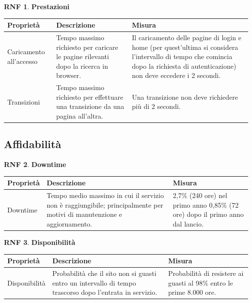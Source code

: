 \documentclass[11pt, a4paper]{article}
\theoremstyle{definition}
\newtheorem{nonfuncreq}{RNF} %
\begin{document}
\begin{nonfuncreq}
    \textbf{Prestazioni }
    \begin{center}
        \footnotesize
        \begin{tabularx}{\textwidth}{|X||X||X|}
            \hline
            \cellcolor{red!70}Proprietà & \cellcolor{red!70}Descrizione & \cellcolor{red!70}Misura\\
            \hline
            Caricamento all'accesso & Tempo massimo richiesto per caricare le pagine rilevanti dopo la ricerca in browser. & Il caricamento delle pagine di login e home (per quest'ultima si considera l'intervallo di tempo che comincia dopo la richiesta di autenticazione) non deve eccedere i 2 secondi.\\
            \hline
            Transizioni & Tempo massimo richiesto per effettuare una transizione da una pagina all'altra.  & Una transizione non deve richiedere più di 2 secondi.\\
            \hline
        \end{tabularx}
    \end{center}
\end{nonfuncreq}


\subsection{Affidabilità}

\begin{nonfuncreq}
    \textbf{Downtime }
    \begin{center}
        \footnotesize
        \begin{tabularx}{\textwidth}{|X||X||X|}
            \hline
            \cellcolor{red!70}Proprietà & \cellcolor{red!70}Descrizione & \cellcolor{red!70}Misura\\
            \hline
            Downtime & Tempo medio massimo in cui il servizio non è raggiungibile; principalmente per motivi di manutenzione e aggiornamento. & 2,7\% (240 ore) nel primo anno 0,85\% (72 ore) dopo il primo anno dal lancio.\\
            \hline
        \end{tabularx}
    \end{center}
\end{nonfuncreq}

\begin{nonfuncreq}
    \textbf{Disponibilità }
    \begin{center}
        \footnotesize
        \begin{tabularx}{\textwidth}{|X||X||X|}
            \hline
            \cellcolor{red!70}Proprietà & \cellcolor{red!70}Descrizione & \cellcolor{red!70}Misura\\
            \hline
            Disponibilità & Probabilità che il sito non si guasti entro un intervallo di tempo trascorso dopo l'entrata in servizio. & Probabilità di resistere ai guasti al 98\% entro le prime 8.000 ore.\\
            \hline
        \end{tabularx}
    \end{center}
\end{nonfuncreq}
\end{document}
